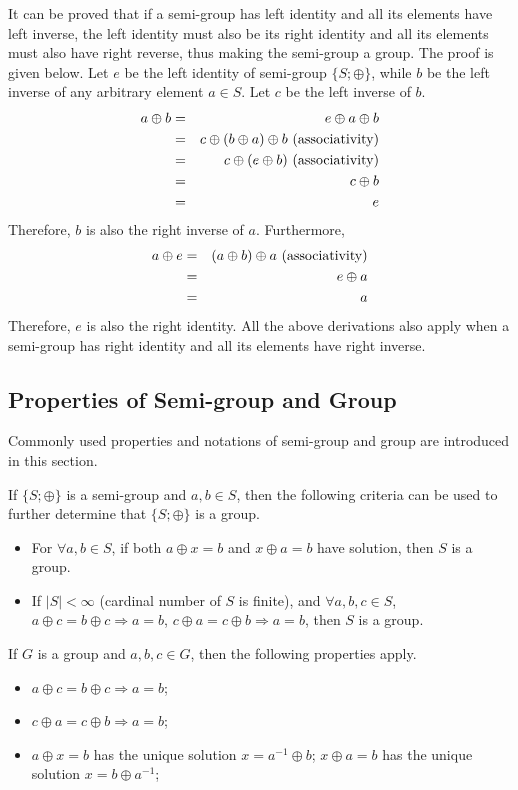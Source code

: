 It can be proved that if a semi-group has left identity and all its elements have left inverse, the left identity must also be its right identity and all its elements must also have right reverse, thus making the semi-group a group. The proof is given below. Let $e$ be the left identity of semi-group $\{S;\oplus \}$, while $b$ be the left inverse of any arbitrary element $a\in S$. Let $c$ be the left inverse of $b$.
\begin{eqnarray}
a\oplus b &=& e\oplus a\oplus b \nonumber \\
   &=& c\oplus (b\oplus a)\oplus b ~\textup{(associativity)} \nonumber \\
   &=& c\oplus (e\oplus b) ~\textup{(associativity)} \nonumber \\ 
   &=& c\oplus b \nonumber \\ 
   &=& e \nonumber
\end{eqnarray}
Therefore, $b$ is also the right inverse of $a$. Furthermore,
\begin{eqnarray}
a\oplus e &=& (a\oplus b)\oplus a ~\textup{(associativity)} \nonumber \\
   &=& e\oplus a \nonumber \\
   &=& a \nonumber
\end{eqnarray}
Therefore, $e$ is also the right identity. All the above derivations also apply when a semi-group has right identity and all its elements have right inverse.

\subsection{Properties of Semi-group and Group}

Commonly used properties and notations of semi-group and group are introduced in this section.

If $\{S; \oplus\}$ is a semi-group and $a, b \in S$, then the following criteria can be used to further determine that $\{S; \oplus\}$ is a group.
\begin{itemize}
  \item For $\forall a, b \in S$, if both $a\oplus x = b$ and $x\oplus a = b$ have solution, then $S$ is a group.
  \item If $|S|<\infty$ (cardinal number of $S$ is finite), and $\forall a, b, c \in S$, $a\oplus c = b\oplus c \Rightarrow a = b$, $c\oplus a = c\oplus b \Rightarrow a = b$, then $S$ is a group.
\end{itemize}

If $G$ is a group and $a, b, c \in G$, then the following properties apply. 
\begin{itemize}
  \item $a\oplus c = b\oplus c \Rightarrow a = b$;
  \item $c\oplus a = c\oplus b \Rightarrow a = b$;
  \item $a\oplus x = b$ has the unique solution $x = a^{-1}\oplus b$; $x\oplus a = b$ has the unique solution $x = b\oplus a^{-1}$;
\end{itemize}

